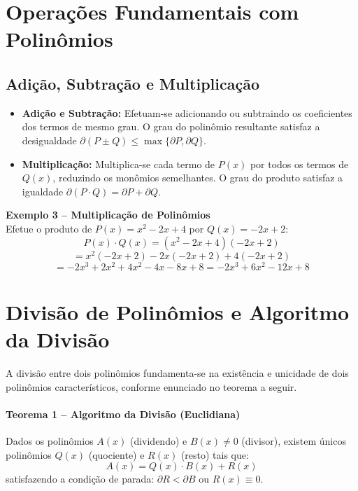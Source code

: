 \documentclass[12pt,a4paper]{article}
\begin{document}
\section{Operações Fundamentais com Polinômios}

\subsection{Adição, Subtração e Multiplicação}
\begin{itemize}[leftmargin=*]
    \item \textbf{Adição e Subtração:} Efetuam-se adicionando ou subtraindo os coeficientes dos termos de mesmo grau. O grau do polinômio resultante satisfaz a desigualdade $\partial(P \pm Q) \le \max\{\partial P, \partial Q\}$.
    \item \textbf{Multiplicação:} Multiplica-se cada termo de $P(x)$ por todos os termos de $Q(x)$, reduzindo os monômios semelhantes. O grau do produto satisfaz a igualdade $\partial(P \cdot Q) = \partial P + \partial Q$.
\end{itemize}

\begin{destaquebox}
\textbf{Exemplo 3 -- Multiplicação de Polinômios}\\
Efetue o produto de $P(x) = x^2 - 2x + 4$ por $Q(x) = -2x + 2$:
\[ P(x) \cdot Q(x) = (x^2 - 2x + 4)(-2x + 2) \]
\[ = x^2(-2x + 2) - 2x(-2x + 2) + 4(-2x + 2) \]
\[ = -2x^3 + 2x^2 + 4x^2 - 4x - 8x + 8 = -2x^3 + 6x^2 - 12x + 8 \]
\end{destaquebox}

\section{Divisão de Polinômios e Algoritmo da Divisão}

A divisão entre dois polinômios fundamenta-se na existência e unicidade de dois polinômios característicos, conforme enunciado no teorema a seguir.

\paragraph{Teorema 1 -- Algoritmo da Divisão (Euclidiana)}
Dados os polinômios $A(x)$ (dividendo) e $B(x) \neq 0$ (divisor), existem únicos polinômios $Q(x)$ (quociente) e $R(x)$ (resto) tais que:
\[ A(x) = Q(x) \cdot B(x) + R(x) \]
satisfazendo a condição de parada: $\partial R < \partial B$ ou $R(x) \equiv 0$.
\end{document}
